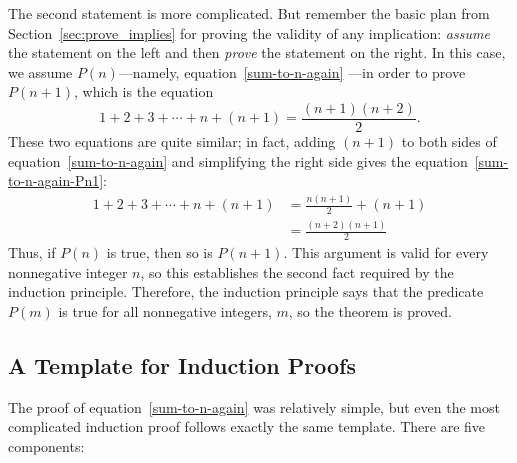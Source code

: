 The second statement is more complicated.  But remember the basic
plan from Section~\ref{sec:prove_implies} for proving the validity of
any implication: \emph{assume} the statement on the left and then
\emph{prove} the statement on the right.  In this case, we assume
$P(n)$---namely, equation~\ref{sum-to-n-again} ---in order to prove
$P(n+1)$, which is the equation
\begin{equation}\label{sum-to-n-again-Pn1}
1 + 2 + 3 + \cdots + n + (n+1) = \frac{(n+1)(n+2)}{2}.
\end{equation}
These two equations are quite similar; in fact, adding $(n+1)$ to both
sides of equation~\eqref{sum-to-n-again} and simplifying the right side 
gives the equation~\eqref{sum-to-n-again-Pn1}:
\begin{align*}
1 + 2 + 3 + \cdots + n + (n+1)
    & = \frac{n(n+1)}{2} + (n+1) \\
    & = \frac{(n+2)(n+1)}{2}
\end{align*}
Thus, if $P(n)$ is true, then so is $P(n+1)$.  This argument is valid for
every nonnegative integer $n$, so this establishes the second fact
required by the induction principle.  Therefore, the induction principle
says that the predicate $P(m)$ is true for all nonnegative integers, $m$,
so the theorem is proved.

\iffalse
In effect, we've just proved
that $P(0)$ implies $P(1)$, $P(1)$ implies $P(2)$, $P(2)$ implies
$P(3)$, etc., all in one fell swoop.
\fi

\subsection{A Template for Induction Proofs}
\label{templ-induct-proofs}

The proof of equation~\eqref{sum-to-n-again} was relatively simple,
but even the most complicated induction proof follows exactly the same
template.  There are five components:

